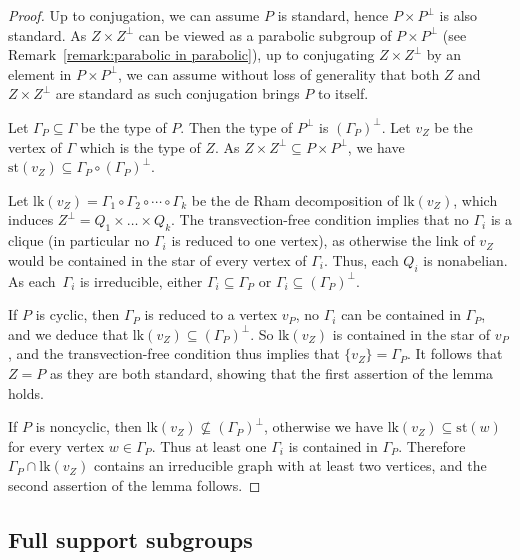 \documentclass[11pt]{article}
\newcommand{\Subsection}{\subsection}
\numberwithin{equation}{section}
\theoremstyle{plain}
\theoremstyle{definition}
\newcommand{\lk}{\mathrm{lk}}
\newcommand{\st}{\mathrm{st}}
\begin{document}
\begin{proof}
Up to conjugation, we can assume $P$ is standard, hence $P\times P^\perp$ is also standard. As $Z\times Z^\perp$ can be viewed as a parabolic subgroup of $P\times P^\perp$ (see Remark~\ref{remark:parabolic in parabolic}), up to conjugating $Z\times Z^\perp$ by an element in $P\times P^\perp$, we can assume without loss of generality that both $Z$ and $Z\times Z^\perp$ are standard as such conjugation brings $P$ to itself.

Let $\Gamma_P\subseteq\Gamma$ be the type of $P$. Then the type of $P^\perp$ is $(\Gamma_P)^\perp$. Let $v_Z$ be the vertex of $\Gamma$ which is the type of $Z$. As $Z\times Z^{\perp}\subseteq P\times P^{\perp}$, we have $\st(v_Z)\subseteq \Gamma_P\circ (\Gamma_P)^\perp$.

Let $\lk(v_Z)=\Gamma_1\circ\Gamma_2\circ\cdots\circ\Gamma_k$ be the de Rham decomposition of $\lk(v_Z)$, which induces $Z^{\perp}=Q_1\times\dots \times Q_k$. The transvection-free condition implies that no $\Gamma_i$ is a clique (in particular no $\Gamma_i$ is reduced to one vertex), as otherwise the link of $v_Z$ would be contained in the star of every vertex of $\Gamma_i$. Thus, each $Q_i$ is nonabelian. As each~$\Gamma_i$ is irreducible, either $\Gamma_i\subseteq\Gamma_P$ or $\Gamma_i\subseteq (\Gamma_{P})^\perp$.

If $P$ is cyclic, then $\Gamma_P$ is reduced to a vertex $v_P$, no $\Gamma_i$ can be contained in $\Gamma_P$, and we deduce that $\lk(v_Z)\subseteq (\Gamma_P)^\perp$. So $\lk(v_Z)$ is contained in the star of $v_P$, and the transvection-free condition thus implies that $\{v_Z\}=\Gamma_P$. It follows that $Z=P$ as they are both standard, showing that the first assertion of the lemma holds.

If $P$ is noncyclic, then $\lk(v_Z)\nsubseteq (\Gamma_P)^\perp$, otherwise we have $\lk(v_Z)\subseteq \st(w)$ for every vertex $w\in\Gamma_P$. Thus at least one $\Gamma_i$ is contained in $\Gamma_P$. Therefore $\Gamma_P\cap\lk(v_Z)$ contains an irreducible graph with at least two vertices, and the second assertion of the lemma follows.
\end{proof}

\Subsection{Full support subgroups}\label{sec:full-support}
\end{document}

